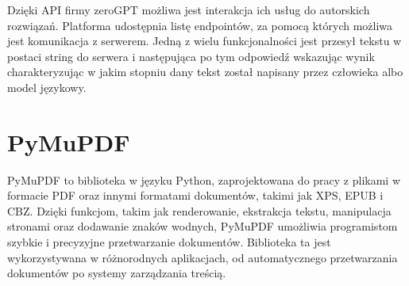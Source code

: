 Dzięki API firmy zeroGPT możliwa jest interakcja ich usług do autorskich rozwiązań. Platforma udostępnia listę endpointów, za pomocą których możliwa jest komunikacja z serwerem. Jedną z wielu funkcjonalności jest przesył tekstu w postaci string do serwera i następująca po tym odpowiedź wskazując wynik charakteryzując w jakim stopniu dany tekst został napisany przez człowieka albo model językowy.

\section{PyMuPDF}
PyMuPDF to biblioteka w języku Python, zaprojektowana do pracy z plikami w formacie PDF oraz innymi formatami dokumentów, takimi jak XPS, EPUB i CBZ. Dzięki funkcjom, takim jak renderowanie, ekstrakcja tekstu, manipulacja stronami oraz dodawanie znaków wodnych, PyMuPDF umożliwia programistom szybkie i precyzyjne przetwarzanie dokumentów. Biblioteka ta jest wykorzystywana w różnorodnych aplikacjach, od automatycznego przetwarzania dokumentów po systemy zarządzania treścią.